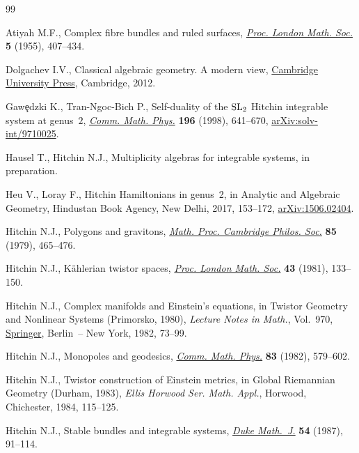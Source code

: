 \documentclass[pdftex]{sigma}
\numberwithin{equation}{section}
\begin{document}
\begin{thebibliography}{99}
\footnotesize\itemsep=0pt

Atiyah M.F., Complex fibre bundles and ruled surfaces, \href{https://doi.org/10.1112/plms/s3-5.4.407}{\textit{Proc. London
 Math. Soc.}} \textbf{5} (1955), 407--434.

Dolgachev I.V., Classical algebraic geometry. A modern view, \href{https://doi.org/10.1017/CBO9781139084437}{Cambridge
 University Press}, Cambridge, 2012.

Gaw\c{e}dzki K., Tran-Ngoc-Bich P., Self-duality of the {${\rm SL}_2$}
 {H}itchin integrable system at genus~{$2$}, \href{https://doi.org/10.1007/s002200050438}{\textit{Comm. Math. Phys.}}
 \textbf{196} (1998), 641--670, \href{https://arxiv.org/abs/solv-int/9710025}{arXiv:solv-int/9710025}.

Hausel T., Hitchin N.J., Multiplicity algebras for integrable systems, in
 preparation.

Heu V., Loray F., Hitchin {H}amiltonians in genus~2, in Analytic and Algebraic
 Geometry, Hindustan Book Agency, New Delhi, 2017, 153--172,
 \href{https://arxiv.org/abs/1506.02404}{arXiv:1506.02404}.

Hitchin N.J., Polygons and gravitons, \href{https://doi.org/10.1017/S0305004100055924}{\textit{Math. Proc. Cambridge Philos.
 Soc.}} \textbf{85} (1979), 465--476.

Hitchin N.J., K\"ahlerian twistor spaces, \href{https://doi.org/10.1112/plms/s3-43.1.133}{\textit{Proc. London Math. Soc.}}
 \textbf{43} (1981), 133--150.

Hitchin N.J., Complex manifolds and {E}instein's equations, in Twistor Geometry
 and Nonlinear Systems ({P}rimorsko, 1980), \textit{Lecture Notes in Math.},
 Vol.~970, \href{https://doi.org/10.1007/BFb0066025}{Springer}, Berlin~-- New York, 1982, 73--99.

Hitchin N.J., Monopoles and geodesics, \href{https://doi.org/10.1007/BF01208717}{\textit{Comm. Math. Phys.}} \textbf{83}
 (1982), 579--602.

Hitchin N.J., Twistor construction of {E}instein metrics, in Global
 {R}iemannian Geometry ({D}urham, 1983), \textit{Ellis Horwood Ser. Math. Appl.},
 Horwood, Chichester, 1984, 115--125.

Hitchin N.J., Stable bundles and integrable systems, \href{https://doi.org/10.1215/S0012-7094-87-05408-1}{\textit{Duke Math.~J.}}
 \textbf{54} (1987), 91--114.


\end{thebibliography}
\end{document}

